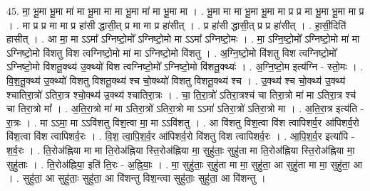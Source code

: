 \documentclass[17pt]{extarticle}
\begin{document}
45. मा॒ भू॒मा भू॒मा मा॑ मा भू॒मा मा मा भू॒मा मा॑ मा भू॒मा मा । . भू॒मा मा मा भू॒मा भू॒मा मा प्र प्र मा भू॒मा भू॒मा मा प्र । . मा प्र प्र मा मा प्र हा॑सी द्धासी॒त् प्र मा मा प्र हा॑सीत् । . प्र हा॑सी द्धासी॒त् प्र प्र हा॑सीत् । . हा॒सी॒दिति॑ हासीत् । . आ मा॒ मा ऽऽमा᳚ ऽग्निष्टो॒मो᳚ ऽग्निष्टो॒मो मा ऽऽमा᳚ ऽग्निष्टो॒मः । . मा॒ ऽग्नि॒ष्टो॒मो᳚ ऽग्निष्टो॒मो मा॑ मा ऽग्निष्टो॒मो वि॑शतु विश त्वग्निष्टो॒मो मा॑ मा ऽग्निष्टो॒मो वि॑शतु । . अ॒ग्नि॒ष्टो॒मो वि॑शतु विश त्वग्निष्टो॒मो᳚ ऽग्निष्टो॒मो वि॑शतू॒क्थ्य॑ उ॒क्थ्यो॑ विश त्वग्निष्टो॒मो᳚ ऽग्निष्टो॒मो वि॑शतू॒क्थ्यः॑ । . अ॒ग्नि॒ष्टो॒म इत्य॑ग्नि - स्तो॒मः । . वि॒श॒तू॒क्थ्य॑ उ॒क्थ्यो॑ विशतु विशतू॒क्थ्य॑ श्च चो॒क्थ्यो॑ विशतु विशतू॒क्थ्य॑ श्च । . उ॒क्थ्य॑ श्च चो॒क्थ्य॑ उ॒क्थ्य॑ श्चातिरा॒त्रो॑ ऽतिरा॒त्र श्चो॒क्थ्य॑ उ॒क्थ्य॑ श्चातिरा॒त्रः । . चा॒ ति॒रा॒त्रो॑ ऽतिरा॒त्रश्च॑ चा तिरा॒त्रो मा॑ मा ऽतिरा॒त्र श्च॑ चा तिरा॒त्रो मा᳚ । . अ॒ति॒रा॒त्रो मा॑ मा ऽतिरा॒त्रो॑ ऽतिरा॒त्रो मा ऽऽमा॑ ऽतिरा॒त्रो॑ ऽतिरा॒त्रो मा । . अ॒ति॒रा॒त्र इत्य॑ति - रा॒त्रः । . मा ऽऽमा॒ मा ऽऽवि॑शतु विश॒त्वा मा॒ मा ऽऽवि॑शतु । . आ वि॑शतु विश॒त्वा वि॑श त्वापिशर्व॒र आ॑पिशर्व॒रो वि॑श॒त्वा वि॑श त्वापिशर्व॒रः । . वि॒श॒ त्वा॒पि॒श॒र्व॒र आ॑पिशर्व॒रो वि॑शतु विश त्वापिशर्व॒रः । . आ॒पि॒श॒र्व॒र इत्या॑पि - श॒र्व॒रः । . ति॒रोअ॑ह्निया मा मा ति॒रोअ॑ह्निया स्ति॒रोअ॑ह्निया मा॒ सुहु॑ताः॒ सुहु॑ता मा ति॒रोअ॑ह्निया स्ति॒रोअ॑ह्निया मा॒ सुहु॑ताः । . ति॒रोअ॑ह्निया॒ इति॑ ति॒रः - अ॒ह्नि॒याः॒ । . मा॒ सुहु॑ताः॒ सुहु॑ता मा मा॒ सुहु॑ता॒ आ सुहु॑ता मा मा॒ सुहु॑ता॒ आ । . सुहु॑ता॒ आ सुहु॑ताः॒ सुहु॑ता॒ आ वि॑शन्तु विश॒न्त्वा सुहु॑ताः॒ सुहु॑ता॒ आ वि॑शन्तु । \newline
\end{document}
